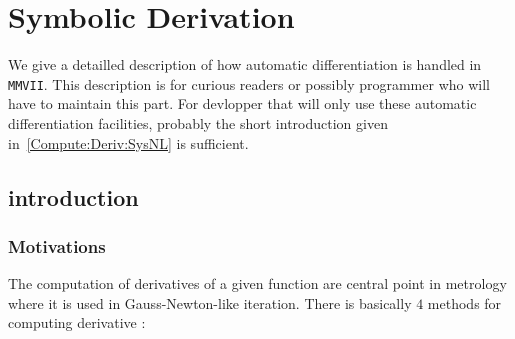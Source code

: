 \chapter{Symbolic Derivation}

We give a detailled description of how automatic differentiation is handled in {\tt MMVII}.
This description is for curious readers or possibly programmer who will have to maintain this part.
For devlopper that will only use these  automatic differentiation facilities, probably the 
short introduction given in~\ref{Compute:Deriv:SysNL} is sufficient.


\section{introduction}


\subsection{Motivations}

The computation of derivatives of a given function are central point in metrology
where it is used in Gauss-Newton-like iteration.  There is basically $4$ methods
for computing derivative :

